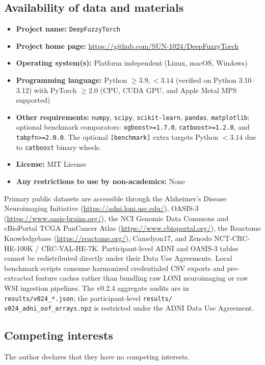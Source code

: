 \documentclass[10pt,twocolumn]{article}
\begin{document}
\subsection*{Availability of data and materials}
\begin{itemize}[leftmargin=1.3em,itemsep=1pt,topsep=2pt]
    \item \textbf{Project name:} \texttt{DeepFuzzyTorch}
    \item \textbf{Project home page:} \url{https://github.com/SUN-1024/DeepFuzzyTorch}
    \item \textbf{Operating system(s):} Platform independent (Linux, macOS, Windows)
    \item \textbf{Programming language:} Python $\ge 3.9, < 3.14$ (verified on Python
    3.10--3.12) with PyTorch $\ge 2.0$ (CPU, CUDA GPU, and Apple Metal MPS supported)
    \item \textbf{Other requirements:} \texttt{numpy}, \texttt{scipy}, \texttt{scikit-learn},
    \texttt{pandas}, \texttt{matplotlib}; optional benchmark comparators:
    \texttt{xgboost>=1.7.0}, \texttt{catboost>=1.2.0}, and \texttt{tabpfn>=2.0.0}. The optional
    \texttt{[benchmark]} extra targets Python $< 3.14$ due to \texttt{catboost} binary wheels.
    \item \textbf{License:} MIT License
    \item \textbf{Any restrictions to use by non-academics:} None
\end{itemize}
Primary public datasets are accessible through the Alzheimer's Disease Neuroimaging Initiative
(\url{https://adni.loni.usc.edu/}), OASIS-3 (\url{https://www.oasis-brains.org/}), the NCI
Genomic Data Commons and cBioPortal TCGA PanCancer Atlas (\url{https://www.cbioportal.org/}),
the Reactome Knowledgebase (\url{https://reactome.org/}), Camelyon17, and Zenodo
NCT-CRC-HE-100K / CRC-VAL-HE-7K. Participant-level ADNI and OASIS-3 tables cannot be
redistributed directly under their Data Use Agreements. Local benchmark scripts consume
harmonized credentialed CSV exports and pre-extracted feature caches rather than bundling raw
LONI neuroimaging or raw WSI ingestion pipelines. The v0.2.4 aggregate audits are in
\texttt{results/v024\_*.json}; the participant-level \texttt{results/\allowbreak
v024\_adni\_oof\_arrays.npz} is restricted under the ADNI Data Use Agreement.

\subsection*{Competing interests}
The author declares that they have no competing interests.
\end{document}
